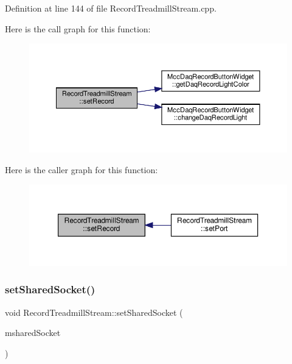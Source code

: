 Definition at line 144 of file Record\+Treadmill\+Stream.\+cpp.

Here is the call graph for this function\+:
\nopagebreak
\begin{figure}[H]
\begin{center}
\leavevmode
\includegraphics[width=350pt]{class_record_treadmill_stream_acc6674f00b212bb11e642f9d54a2edb4_cgraph}
\end{center}
\end{figure}
Here is the caller graph for this function\+:
\nopagebreak
\begin{figure}[H]
\begin{center}
\leavevmode
\includegraphics[width=350pt]{class_record_treadmill_stream_acc6674f00b212bb11e642f9d54a2edb4_icgraph}
\end{center}
\end{figure}
\mbox{\label{class_record_treadmill_stream_a58798d23f74b7a9e067020a9cc404908}} 
\subsubsection{\texorpdfstring{set\+Shared\+Socket()}{setSharedSocket()}}
{\footnotesize\ttfamily void Record\+Treadmill\+Stream\+::set\+Shared\+Socket (\begin{DoxyParamCaption}\item[{Q\+Abstract\+Socket $\ast$}]{mshared\+Socket }\end{DoxyParamCaption})}



